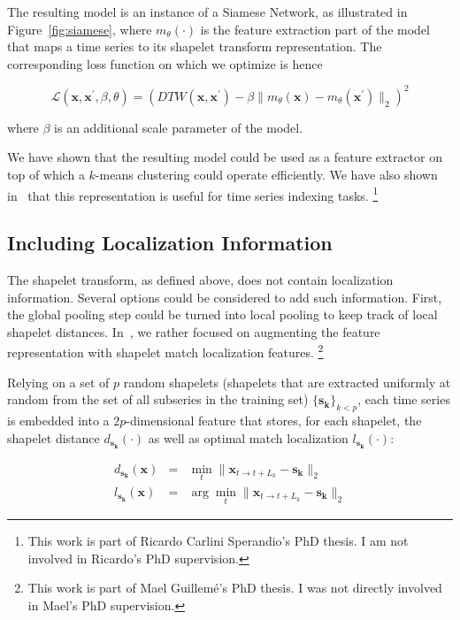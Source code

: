 The resulting model is an instance of a Siamese Network, as illustrated in
Figure~\ref{fig:siamese},
where $m_\theta(\cdot)$ is the feature extraction part of the model that
maps a time series to its shapelet transform representation.
The corresponding loss function on which we optimize is hence

\begin{equation}
    \mathcal{L}(\mathbf{x}, \mathbf{x}^\prime, \beta, \theta) =
        \left(
            DTW(\mathbf{x}, \mathbf{x}^\prime) -
                \beta \| m_\theta(\mathbf{x}) - m_\theta(\mathbf{x}^\prime) \|_2
        \right)^2
\end{equation}

\noindent
where $\beta$ is an additional scale parameter of the model.

We have shown that the resulting model could be used as a feature extractor on top of
which a $k$-means clustering could operate efficiently.
We have also shown in~\cite{carlinisperandio:hal-01841995} that this
representation is useful for time series indexing tasks.%
\footnote{This work is part of Ricardo Carlini Sperandio's PhD thesis.
I am not involved in Ricardo's PhD supervision.}

\subsection{Including Localization Information}

The shapelet transform, as defined above, does not contain localization
information. Several options could be considered to add such
information. First, the global pooling step could be turned into local pooling
to keep track of local shapelet distances.
In~\cite{guilleme:hal-02513295}, we rather focused on augmenting the feature
representation with shapelet match localization features.%
\footnote{This work is part of Mael Guillemé's PhD thesis.
I was not directly involved in Mael's PhD supervision.}

Relying on a set of $p$ random shapelets (shapelets that are extracted
uniformly at
random from the set of all subseries in the training set)
$\{\mathbf{s_k}\}_{k < p}$,
each time series is embedded into a $2p$-dimensional feature that stores, for
each shapelet, the shapelet distance $d_{\mathbf{s_k}}(\cdot)$ as well as
optimal  match localization $l_{\mathbf{s_k}}(\cdot)$:

\begin{eqnarray}
    d_{\mathbf{s_k}}(\mathbf{x}) &=& \min_t
        \|\mathbf{x}_{t \rightarrow t+L_k} - \mathbf{s_k}\|_2 \\
    l_{\mathbf{s_k}}(\mathbf{x}) &=& \arg \min_t
        \|\mathbf{x}_{t \rightarrow t+L_k} - \mathbf{s_k}\|_2
\end{eqnarray}

